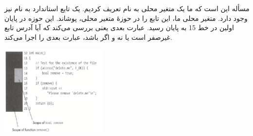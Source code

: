 \section{}
\paragraph{}\label{answer:35}
مسأله این است که ما یک متغیر محلی به نام  تعریف کردیم. یک تابع استاندارد به نام  نیز وجود دارد. متغیر محلی ما، این تابع را در حوزهٔ متغیر محلی، پوشاند. این حوزه در پایان اولین  در خط 15 به پایان رسید. عبارت بعدی یعنی  بررسی می‌کند که آیا آدرس تابع  غیرصفر است یا نه و اگر باشد، عبارت بعدی را اجرا می‌کند.

\begin{center}
    \includegraphics[keepaspectratio,width=0.4\textwidth,height=0.4\textheight]{images/image02.jpg}
\end{center}